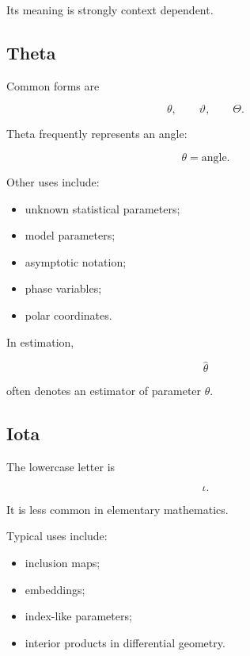 Its meaning is strongly context dependent.

\subsection{Theta}
\label{subsec:greek-theta}

Common forms are

\[
\boxed{
\theta,
\qquad
\vartheta,
\qquad
\Theta.
}
\]

Theta frequently represents an angle:

\[
\boxed{
\theta
=
\text{angle}.
}
\]

Other uses include:

\begin{itemize}
    \item unknown statistical parameters;
    \item model parameters;
    \item asymptotic notation;
    \item phase variables;
    \item polar coordinates.
\end{itemize}

In estimation,

\[
\boxed{
\hat{\theta}
}
\]

often denotes an estimator of parameter \(\theta\).

\subsection{Iota}
\label{subsec:greek-iota}

The lowercase letter is

\[
\boxed{
\iota.
}
\]

It is less common in elementary mathematics.

Typical uses include:

\begin{itemize}
    \item inclusion maps;
    \item embeddings;
    \item index-like parameters;
    \item interior products in differential geometry.
\end{itemize}


